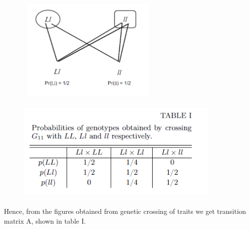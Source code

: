 \documentclass{article}
\begin{document}
\begin{itemize}
\begin{figure}[h]
\begin{minipage}[b]{0.32\textwidth}
    	\end{minipage}
    	\includegraphics[height= 5cm ,width=7cm]{a2}               
    \end{figure}
     
    \begin{figure}[h]
    	\centering
    	\includegraphics[height= 5cm ,width=10cm]{table}
    \end{figure} 
    Hence, from the figures obtained from genetic crossing of traits we get transition matrix A, shown in table I.
    

\end{itemize}
\end{document}
